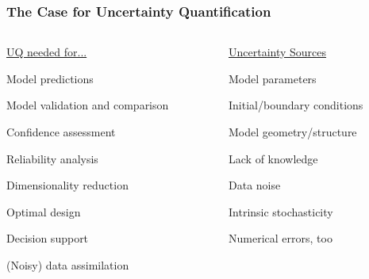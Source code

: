 \begin{frame}[t]
\label{intro-caseuq}

\frametitle{The Case for Uncertainty Quantification}
\medskip

\begin{columns}[T,totalwidth=\textwidth]
  \begin{column}{0.5\textwidth}

\parbox{8cm}{

{\Large \underline{UQ needed for...}}
\bi
\setlength\itemsep{0.3cm}
\item Model predictions
\item Model validation and comparison
\item Confidence assessment
\item Reliability analysis
\item Dimensionality reduction
\item Optimal design
\item Decision support
\item (Noisy) data assimilation
\ei


}
\end{column}
  \begin{column}{0.6\textwidth}

\hspace*{0.7cm}
\parbox{8cm}{

{\Large \underline{Uncertainty Sources}}

\bi
\setlength\itemsep{0.4cm}
\item Model parameters
\item Initial/boundary conditions
\item Model geometry/structure
\item Lack of knowledge
\item Data noise
\item Intrinsic stochasticity
\item Numerical errors, too

\ei
}
\end{column}
\end{columns}

\end{frame}
